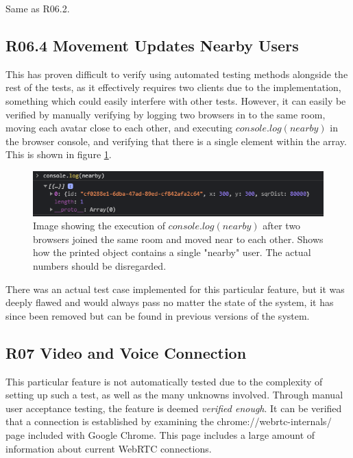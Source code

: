 Same as R06.2.

\subsection{R06.4 Movement Updates Nearby Users}
\label{vR06.4}

This has proven difficult to verify using automated testing methods alongside the rest of the tests, as it effectively requires two clients due to the implementation, something which could easily interfere with other tests. However, it can easily be verified by manually verifying by logging two browsers in to the same room, moving each avatar close to each other, and executing $console.log(nearby)$ in the browser console, and verifying that there is a single element within the array. This is shown in figure \ref{fig:verifiednearby}.

\begin{figure}[H]
    \centering
    \includegraphics[width=\textwidth]{Pictures/ValidateNearby.png}
    \caption{Image showing the execution of $console.log(nearby)$ after two browsers joined the same room and moved near to each other. Shows how the printed object contains a single "nearby" user. The actual numbers should be disregarded.}
    \label{fig:verifiednearby}
\end{figure}

There was an actual test case implemented for this particular feature, but it was deeply flawed and would always pass no matter the state of the system, it has since been removed but can be found in previous versions of the system.

\subsection{R07 Video and Voice Connection}
\label{vR07}

This particular feature is not automatically tested due to the complexity of setting up such a test, as well as the many unknowns involved. Through manual user acceptance testing, the feature is deemed \textit{verified enough}. It can be verified that a connection is established by examining the chrome://webrtc-internals/ page included with Google Chrome. This page includes a large amount of information about current WebRTC connections.

